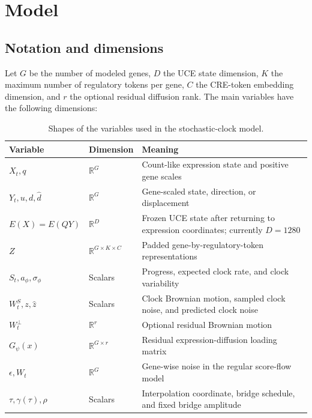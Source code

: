 \documentclass[11pt]{article}
\newcommand{\uce}{UCE}
\newcommand{\R}{\mathbb{R}}
\begin{document}
\section{Model}

\subsection{Notation and dimensions}

Let $G$ be the number of modeled genes, $D$ the \uce{} state dimension, $K$
the maximum number of regulatory tokens per gene, $C$ the CRE-token embedding
dimension, and $r$ the optional residual diffusion rank. The main variables
have the following dimensions:
\begin{table}[ht]
\centering
\small
\begin{tabular}{@{}p{}p{}p{}@{}}
\toprule
Variable & Dimension & Meaning \\
\midrule
$X_t,q$ & $\R^G$ & Count-like expression state and positive gene scales \\
$Y_t,u,d,\widehat d$ & $\R^G$ & Gene-scaled state, direction, or displacement \\
$E(X)=E(QY)$ & $\R^D$ & Frozen \uce{} state after returning to expression coordinates; currently $D=1280$ \\
$Z$ & $\R^{G\times K\times C}$ & Padded gene-by-regulatory-token representations \\
$S_t,a_\phi,\sigma_\phi$ & Scalars & Progress, expected clock rate, and clock variability \\
$W_t^S,z,\widehat z$ & Scalars & Clock Brownian motion, sampled clock noise, and predicted clock noise \\
$W_t^\perp$ & $\R^r$ & Optional residual Brownian motion \\
$G_\psi(x)$ & $\R^{G\times r}$ & Residual expression-diffusion loading matrix \\
$\epsilon,W_t$ & $\R^G$ & Gene-wise noise in the regular score-flow model \\
$\tau,\gamma(\tau),\rho$ & Scalars & Interpolation coordinate, bridge schedule, and fixed bridge amplitude \\
\bottomrule
\end{tabular}
\caption{Shapes of the variables used in the stochastic-clock model.}
\label{tab:dimensions}
\end{table}
\end{document}
